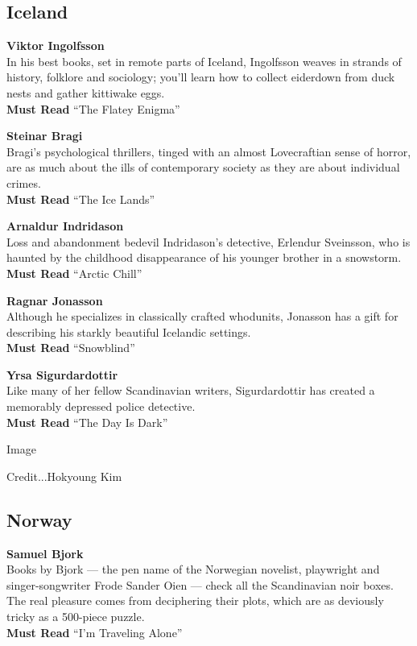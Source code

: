 \hypertarget{iceland}{%
\subsection{Iceland}\label{iceland}}

\textbf{Viktor Ingolfsson}\\
In his best books, set in remote parts of Iceland, Ingolfsson weaves in
strands of history, folklore and sociology; you'll learn how to collect
eiderdown from duck nests and gather kittiwake eggs.\\
\textbf{Must Read} ``The Flatey Enigma''

\textbf{Steinar Bragi}\\
Bragi's psychological thrillers, tinged with an almost Lovecraftian
sense of horror, are as much about the ills of contemporary society as
they are about individual crimes.\\
\textbf{Must Read} ``The Ice Lands''

\textbf{Arnaldur Indridason}\\
Loss and abandonment bedevil Indridason's detective, Erlendur Sveinsson,
who is haunted by the childhood disappearance of his younger brother in
a snowstorm.\\
\textbf{Must Read} ``Arctic Chill''

\textbf{Ragnar Jonasson}\\
Although he specializes in classically crafted whodunits, Jonasson has a
gift for describing his starkly beautiful Icelandic settings.\\
\textbf{Must Read} ``Snowblind''

\textbf{Yrsa Sigurdardottir}\\
Like many of her fellow Scandinavian writers, Sigurdardottir has created
a memorably depressed police detective.\\
\textbf{Must Read} ``The Day Is Dark''

Image

Credit...Hokyoung Kim

\hypertarget{norway}{%
\subsection{Norway}\label{norway}}

\textbf{Samuel Bjork}\\
Books by Bjork --- the pen name of the Norwegian novelist, playwright
and singer-songwriter Frode Sander Oien --- check all the Scandinavian
noir boxes. The real pleasure comes from deciphering their plots, which
are as deviously tricky as a 500-piece puzzle.\\
\textbf{Must Read} ``I'm Traveling Alone''

